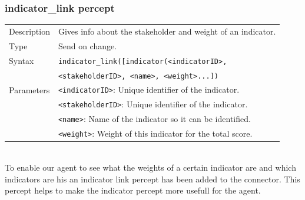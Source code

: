 	\subsubsection*{indicator\_link percept}
		\begin{small}
			\begin{tabular}{p{2cm}p{9cm}}
				Description 	& Gives info about the stakeholder and weight of an indicator.\\
				Type 		& Send on change.\\
				Syntax 	& \verb|indicator_link([indicator(<indicatorID>, |\\
					 	& \verb|<stakeholderID>, <name>, <weight>...]) |\\
				Parameters 	& \verb|<indicatorID>|: Unique identifier of the indicator.\\
						& \verb|<stakeholderID>|: Unique identifier of the indicator.\\
						& \verb|<name>|:  Name of the indicator so it can be identified.\\
						& \verb|<weight>|: Weight of this indicator for the total score.\\
			\end{tabular}
		\end{small}
	\\To enable our agent to see what the weights of a certain indicator are and which indicators are his an indicator link percept has been added to the connector. This percept helps to make the indicator percept more usefull for the agent.

